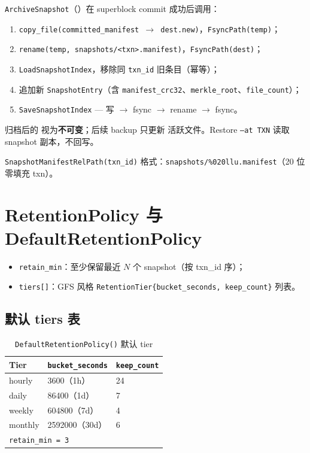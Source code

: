 \texttt{ArchiveSnapshot}（）在 superblock commit 成功后调用：

\begin{enumerate}
  \item \texttt{copy\_file(committed\_manifest $\rightarrow$ dest.new)}，\texttt{FsyncPath(temp)}；
  \item \texttt{rename(temp, snapshots/<txn>.manifest)}，\texttt{FsyncPath(dest)}；
  \item \texttt{LoadSnapshotIndex}，移除同 \texttt{txn\_id} 旧条目（幂等）；
  \item 追加新 \texttt{SnapshotEntry}（含 \texttt{manifest\_crc32}、\texttt{merkle\_root}、\texttt{file\_count}）；
  \item \texttt{SaveSnapshotIndex} — 写  $\rightarrow$ fsync $\rightarrow$ rename $\rightarrow$ fsync。
\end{enumerate}

\begin{invariantbox}
归档后的  视为\textbf{不可变}；后续 backup 只更新  活跃文件。Restore \texttt{--at TXN} 读取 snapshot 副本，不回写。
\end{invariantbox}

\texttt{SnapshotManifestRelPath(txn\_id)} 格式：\texttt{snapshots/\%020llu.manifest}（20 位零填充 txn）。

\section{RetentionPolicy 与 DefaultRetentionPolicy}

\begin{structbox}[RetentionPolicy]
\begin{itemize}[nosep]
  \item \texttt{retain\_min}：至少保留最近 $N$ 个 snapshot（按 txn\_id 序）；
  \item \texttt{tiers[]}：GFS 风格 \texttt{RetentionTier\{bucket\_seconds, keep\_count\}} 列表。
\end{itemize}
\end{structbox}

\subsection{默认 tiers 表}

\begin{table}[htbp]
\centering
\caption{\texttt{DefaultRetentionPolicy()} 默认 tier}
\begin{tabular}{@{}lll@{}}
\toprule
Tier & \texttt{bucket\_seconds} & \texttt{keep\_count} \\
\midrule
hourly & 3600（1h） & 24 \\
daily & 86400（1d） & 7 \\
weekly & 604800（7d） & 4 \\
monthly & 2592000（30d） & 6 \\
\midrule
\multicolumn{3}{l}{\texttt{retain\_min = 3}} \\
\bottomrule
\end{tabular}
\end{table}

